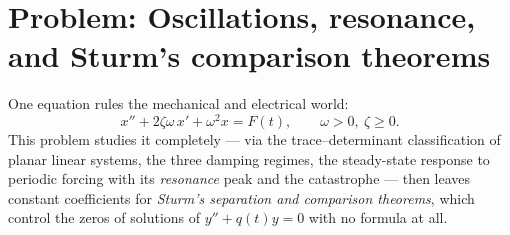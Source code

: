 \section{Problem: Oscillations, resonance, and Sturm's
comparison theorems}

\begin{problem}\label{pb:b2:diffeq:1}
One equation rules the mechanical and electrical world:
\[
x'' + 2\zeta\omega\,x' + \omega^2 x = F(t),
\qquad \omega > 0,\ \zeta \geq 0 .
\]
This problem studies it completely --- via the
trace--determinant classification of planar linear systems,
the three damping regimes, the steady-state response to
periodic forcing with its \emph{resonance}
peak and the  catastrophe --- then leaves constant
coefficients for \emph{Sturm's separation and comparison
theorems}, which control the
zeros of solutions of $y'' + q(t)y = 0$ with no formula at
all.


\end{problem}
